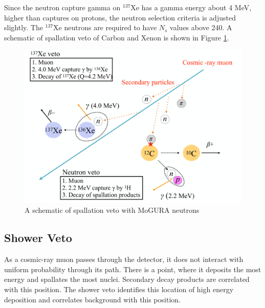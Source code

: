Since the neutron capture gamma on $^{137}$Xe has a gamma energy about 4 MeV, higher than captures on protons, the neutron selection criteria is adjusted slightly. The $^{137}$Xe neutrons are required to have $N_s$ values above 240. A schematic of spallation veto of Carbon and Xenon is shown in Figure \ref{fig:spall_veto}.
\begin{figure}[htb]
	\centering
	\includegraphics[scale=0.35]{spall_veto.png}
	\caption{A schematic of spallation veto with MoGURA neutrons}
	\label{fig:spall_veto}
\end{figure}

\subsection{Shower Veto}
As a cosmic-ray muon passes through the detector, it does not interact with uniform probability through its path. There is a point, where it deposits the most energy and spallates the most nuclei. Secondary decay products are correlated with this position. The shower veto identifies this location of high energy deposition and correlates background with this position.
